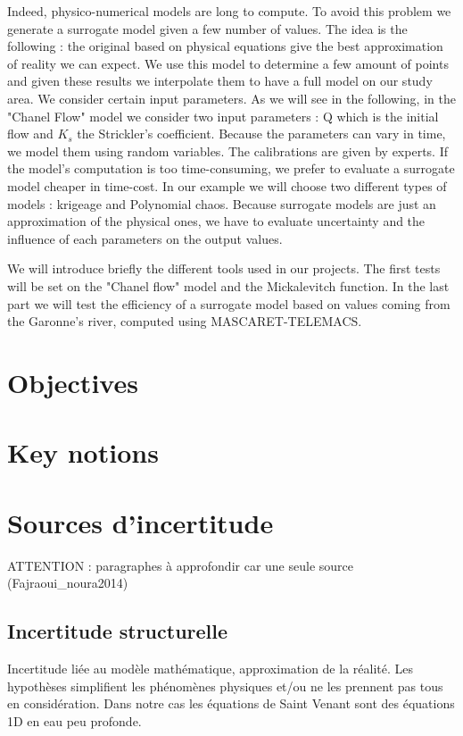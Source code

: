 \documentclass[hidelinks,12pt]{article}
\begin{document}
Indeed, physico-numerical models are long to compute. To avoid this problem we generate a surrogate model given a few number of values. The idea is the following : the original based on physical equations give the best approximation of reality we can expect. We use this model to determine a few amount of points and given these results we interpolate them to have a full model on our study area. 
We consider certain input parameters. As we will see in the following, in the "Chanel Flow" model we consider two input parameters : Q which is the initial flow and $K_s$ the Strickler's coefficient. Because the parameters can vary in time, we model them using random variables. The calibrations are given by experts. 
If the model's computation is too time-consuming, we prefer to evaluate a surrogate model cheaper in time-cost. In our example we will choose two different types of models : krigeage and Polynomial chaos. Because surrogate models are just an approximation of the physical ones, we have to evaluate uncertainty and the influence of each parameters on the output values.

We will introduce briefly the different tools used in our projects. The first tests will be set on the "Chanel flow" model and the Mickalevitch function. In the last part we will test the efficiency of a surrogate model based on values coming from the Garonne's river, computed using MASCARET-TELEMACS.


\section{Objectives}
\section{Key notions}


\section{Sources d’incertitude}

ATTENTION : paragraphes à approfondir car une seule source (Fajraoui_noura2014)


\subsection{Incertitude structurelle }

Incertitude liée au modèle mathématique, approximation de la réalité. Les hypothèses simplifient les phénomènes physiques et/ou ne les prennent pas tous en considération. Dans notre cas les équations de Saint Venant sont des équations 1D en eau peu profonde.
\end{document}
